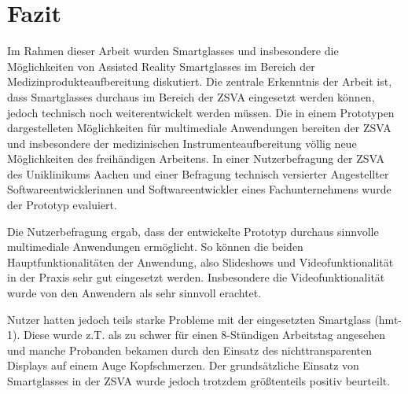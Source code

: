 %
%
%
%
%
%
\chapter{Fazit}
\label{ch:Fazit}

Im Rahmen dieser Arbeit wurden Smartglasses und insbesondere die Möglichkeiten von Assisted Reality Smartglasses im Bereich der Medizinprodukteaufbereitung diskutiert. Die zentrale Erkenntnis der Arbeit ist, dass Smartglasses durchaus im Bereich der ZSVA eingesetzt werden können, jedoch technisch noch weiterentwickelt werden müssen. Die in einem Prototypen dargestelleten Möglichkeiten für multimediale Anwendungen bereiten der ZSVA und insbesondere der medizinischen Instrumenteaufbereitung völlig neue Möglichkeiten des freihändigen Arbeitens. In einer Nutzerbefragung der ZSVA des Uniklinikums Aachen und einer Befragung technisch versierter Angestellter Softwareentwicklerinnen und Softwareentwickler eines Fachunternehmens wurde der Prototyp evaluiert.

Die Nutzerbefragung ergab, dass der entwickelte Prototyp durchaus sinnvolle multimediale Anwendungen ermöglicht. So können die beiden Hauptfunktionalitäten der Anwendung, also Slideshows und Videofunktionalität in der Praxis sehr gut eingesetzt werden. Insbesondere die Videofunktionalität wurde von den Anwendern als sehr sinnvoll erachtet. 

Nutzer hatten jedoch teils starke Probleme mit der eingesetzten Smartglass (hmt-1). Diese wurde z.T. als zu schwer für einen 8-Stündigen Arbeitstag angesehen und manche Probanden bekamen durch den Einsatz des nichttransparenten Displays auf einem Auge Kopfschmerzen. Der grundsätzliche Einsatz von Smartglasses in der ZSVA wurde jedoch trotzdem größtenteils positiv beurteilt.
%
